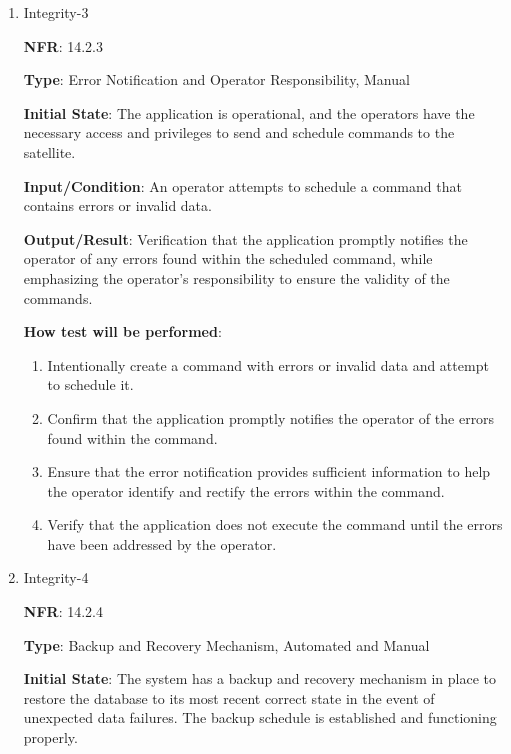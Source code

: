 \documentclass[12pt, titlepage]{article}
\begin{document}
\begin{enumerate}
\item {Integrity-3\\}

\textbf{NFR}: 14.2.3

\textbf{Type}: Error Notification and Operator Responsibility, Manual


\textbf{Initial State}: The application is operational, and the operators have the necessary access and privileges to send and schedule commands to the satellite.




\textbf{Input/Condition}: An operator attempts to schedule a command that contains errors or invalid data.




\textbf{Output/Result}: Verification that the application promptly notifies the operator of any errors found within the scheduled command, while emphasizing the operator's responsibility to ensure the validity of the commands.


\textbf{How test will be performed}: 
\begin{enumerate}
    \item Intentionally create a command with errors or invalid data and attempt to schedule it.


    \item Confirm that the application promptly notifies the operator of the errors found within the command.


    \item Ensure that the error notification provides sufficient information to help the operator identify and rectify the errors within the command.

    \item Verify that the application does not execute the command until the errors have been addressed by the operator.

\end{enumerate}

\item {Integrity-4\\}

\textbf{NFR}: 14.2.4

\textbf{Type}: Backup and Recovery Mechanism, Automated and Manual



\textbf{Initial State}: The system has a backup and recovery mechanism in place to restore the database to its most recent correct state in the event of unexpected data failures. The backup schedule is established and functioning properly.






\end{enumerate}
\end{document}
